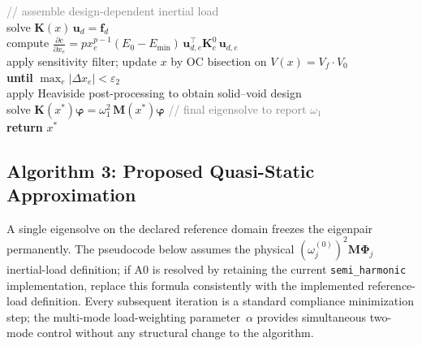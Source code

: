 \documentclass[12pt,a4paper]{article}
\newcommand{\kw}[1]{\textbf{#1}}          %
\newcommand{\var}[1]{\textit{#1}}         %
\newcommand{\cm}[1]{\textcolor{gray}{#1}} %
\newcommand{\ind}{\hspace*{1.4em}}        %
\begin{document}
\begin{algobox}
  \quad\cm{// assemble design-dependent inertial load}\\
\ind solve $\mathbf{K}(\var{x})\,\mathbf{u}_d = \mathbf{f}_d$\\
\ind compute $\frac{\partial c}{\partial x_e}
    = p x_e^{p-1}(E_0-E_{\min})\,\mathbf{u}_{d,e}^{\top}\mathbf{K}_e^0\,\mathbf{u}_{d,e}$\\
\ind apply sensitivity filter; update $x$ by OC bisection on
    $V(\var{x})=V_f\cdot V_0$\\
\kw{until} $\max_e|\Delta x_e| < \varepsilon_2$\\[4pt]
%
apply Heaviside post-processing to obtain solid--void design\\
solve $\mathbf{K}(\var{x}^*)\boldsymbol{\varphi}
      = \omega_1^2\,\mathbf{M}(\var{x}^*)\boldsymbol{\varphi}$
\quad\cm{// final eigensolve to report $\omega_1$}\\[4pt]
\kw{return} $x^*$
\end{algobox}

\subsection{Algorithm 3: Proposed Quasi-Static Approximation}
\label{subsec:alg-proposed}

A single eigensolve on the declared reference domain freezes the eigenpair
permanently.  The pseudocode below assumes the physical
$(\omega_j^{(0)})^2\mathbf{M}\boldsymbol{\Phi}_j$ inertial-load definition;
if A0 is resolved by retaining the current \texttt{semi\_harmonic}
implementation, replace this formula consistently with the implemented
reference-load definition.
Every subsequent iteration is a standard compliance minimization step;
the multi-mode load-weighting parameter~$\alpha$ provides simultaneous
two-mode control without any structural change to the algorithm.
\end{document}
